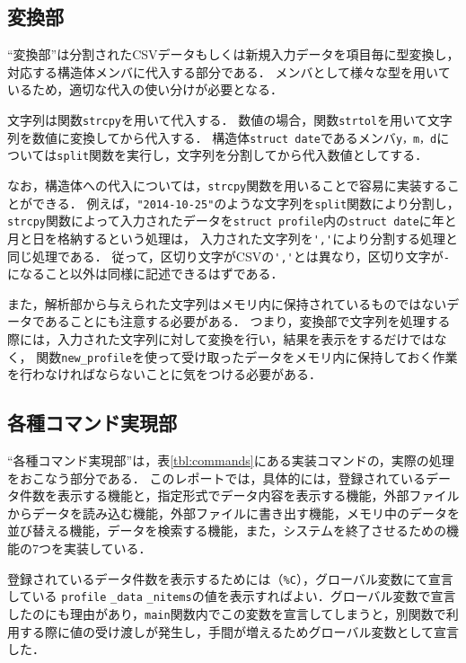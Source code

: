 \documentclass[a4j,11pt]{jarticle}
\begin{document}
\subsection{変換部} \label{sec:exchange}

``変換部''は分割されたCSVデータもしくは新規入力データを項目毎に型変換し，
対応する構造体メンバに代入する部分である．
メンバとして様々な型を用いているため，適切な代入の使い分けが必要となる．

文字列は関数\verb|strcpy|を用いて代入する．
数値の場合，関数\verb|strtol|を用いて文字列を数値に変換してから代入する．
構造体\verb|struct date|であるメンバ\verb|y，m，d|については\verb|split|関数を実行し，文字列を分割してから代入数値としてする．

なお，構造体への代入については，\verb|strcpy|関数を用いることで容易に実装することができる．
例えば，\verb|"2014-10-25"|のような文字列を\verb|split|関数により分割し，
\verb|strcpy|関数によって入力されたデータを\verb|struct profile|内の\verb|struct date|に年と月と日を格納するという処理は，
入力された文字列を\verb|','|により分割する処理と同じ処理である．
従って，区切り文字がCSVの\verb|','|とは異なり，区切り文字が\verb|-|になること以外は同様に記述できるはずである．

また，解析部から与えられた文字列はメモリ内に保持されているものではないデータであることにも注意する必要がある．
つまり，変換部で文字列を処理する際には，入力された文字列に対して変換を行い，結果を表示をするだけではなく，
関数\verb|new_profile|を使って受け取ったデータをメモリ内に保持しておく作業を行わなければならないことに気をつける必要がある．

\subsection{各種コマンド実現部} \label{sec:command}

``各種コマンド実現部''は，表\ref{tbl:commands}にある実装コマンドの，実際の処理をおこなう部分である．
このレポートでは，具体的には，登録されているデータ件数を表示する機能と，指定形式でデータ内容を表示する機能，外部ファイルからデータを読み込む機能，外部ファイルに書き出す機能，メモリ中のデータを並び替える機能，データを検索する機能，また，システムを終了させるための機能の7つを実装している．

登録されているデータ件数を表示するためには（\verb|%C|），グローバル変数にて宣言している
\verb|profile| \verb|_data| \verb|_nitems|の値を表示すればよい．グローバル変数で宣言したのにも理由があり，\verb|main|関数内でこの変数を宣言してしまうと，別関数で利用する際に値の受け渡しが発生し，手間が増えるためグローバル変数として宣言した．
\end{document}
